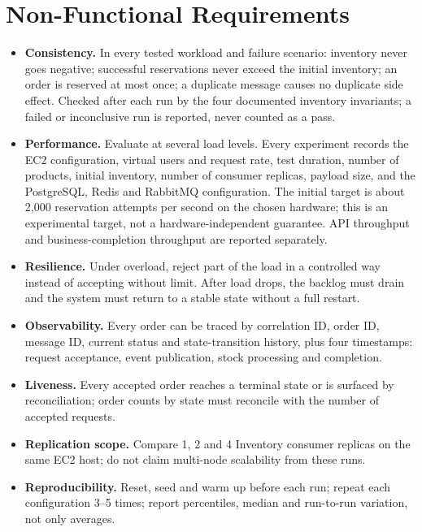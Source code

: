 \documentclass[a4paper]{report}
\begin{document}
\section{Non-Functional Requirements}
\begin{itemize}
  \item \textbf{Consistency.} In every tested workload and failure scenario:
    inventory never goes negative; successful reservations never exceed the
    initial inventory; an order is reserved at most once; a duplicate message
    causes no duplicate side effect. Checked after each run by the four
    documented inventory invariants; a failed or
    inconclusive run is reported, never counted as a pass.
  \item \textbf{Performance.} Evaluate at several load levels. Every experiment
    records the EC2 configuration, virtual users and request rate, test
    duration, number of products, initial inventory, number of consumer
    replicas, payload size, and the PostgreSQL, Redis and RabbitMQ
    configuration. The initial target is about 2,000 reservation attempts per
    second on the chosen hardware; this is an experimental target, not a
    hardware-independent guarantee. API throughput and business-completion
    throughput are reported separately.
  \item \textbf{Resilience.} Under overload, reject part of the load in a
    controlled way instead of accepting without limit. After load drops, the
    backlog must drain and the system must return to a stable state without a
    full restart.
  \item \textbf{Observability.} Every order can be traced by correlation ID,
    order ID, message ID, current status and state-transition history, plus
    four timestamps: request acceptance, event publication, stock processing
    and completion.
  \item \textbf{Liveness.} Every accepted order reaches a terminal state or is
    surfaced by reconciliation; order counts by state must reconcile with the
    number of accepted requests.
  \item \textbf{Replication scope.} Compare 1, 2 and 4 Inventory consumer
    replicas on the same EC2 host; do not claim multi-node scalability from
    these runs.
  \item \textbf{Reproducibility.} Reset, seed and warm up before each run;
    repeat each configuration 3--5 times; report percentiles, median and
    run-to-run variation, not only averages.
\end{itemize}
\end{document}
